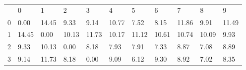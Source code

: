 \documentclass{article}
\begin{document}
\begin{table}[]
	\centering
	\label{my-label}
	\begin{tabular}{lllllllllll}
		                      & 0                                                 & 1                                                 & 2                                                 & 3                                                 & 4                                                 & 5                                                 & 6                                                 & 7                                                 & 8                                                 & 9                                                 \\ \cline{2-11} 
		\multicolumn{1}{l|}{0} & \multicolumn{1}{l|}{\cellcolor[HTML]{C0C0C0}0.00} & \multicolumn{1}{l|}{14.45}                        & \multicolumn{1}{l|}{9.33}                         & \multicolumn{1}{l|}{9.14}                         & \multicolumn{1}{l|}{10.77}                        & \multicolumn{1}{l|}{7.52}                         & \multicolumn{1}{l|}{8.15}                         & \multicolumn{1}{l|}{11.86}                        & \multicolumn{1}{l|}{9.91}                         & \multicolumn{1}{l|}{11.49}                        \\ \cline{2-11} 
		\multicolumn{1}{l|}{1} & \multicolumn{1}{l|}{14.45}                        & \multicolumn{1}{l|}{\cellcolor[HTML]{C0C0C0}0.00} & \multicolumn{1}{l|}{10.13}                        & \multicolumn{1}{l|}{11.73}                        & \multicolumn{1}{l|}{10.17}                        & \multicolumn{1}{l|}{11.12}                        & \multicolumn{1}{l|}{10.61}                        & \multicolumn{1}{l|}{10.74}                        & \multicolumn{1}{l|}{10.09}                        & \multicolumn{1}{l|}{9.93}                         \\ \cline{2-11} 
		\multicolumn{1}{l|}{2} & \multicolumn{1}{l|}{9.33}                         & \multicolumn{1}{l|}{10.13}                        & \multicolumn{1}{l|}{\cellcolor[HTML]{C0C0C0}0.00} & \multicolumn{1}{l|}{8.18}                         & \multicolumn{1}{l|}{7.93}                         & \multicolumn{1}{l|}{7.91}                         & \multicolumn{1}{l|}{7.33}                         & \multicolumn{1}{l|}{8.87}                         & \multicolumn{1}{l|}{7.08}                         & \multicolumn{1}{l|}{8.89}                         \\ \cline{2-11} 
		\multicolumn{1}{l|}{3} & \multicolumn{1}{l|}{9.14}                         & \multicolumn{1}{l|}{11.73}                        & \multicolumn{1}{l|}{8.18}                         & \multicolumn{1}{l|}{\cellcolor[HTML]{C0C0C0}0.00} & \multicolumn{1}{l|}{9.09}                         & \multicolumn{1}{l|}{6.12}                         & \multicolumn{1}{l|}{9.30}                         & \multicolumn{1}{l|}{8.92}                         & \multicolumn{1}{l|}{7.02}                         & \multicolumn{1}{l|}{8.35}                         \\ \cline{2-11} 

\end{tabular}
\end{table}
\end{document}
